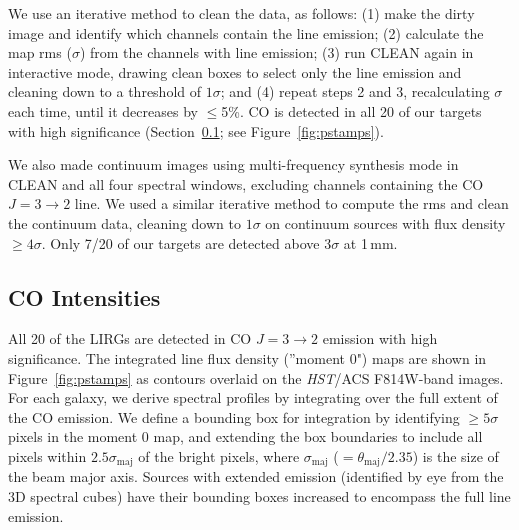 \documentclass[a4paper,fleqn,usenatbib]{mnras}
\begin{document}
We use an iterative method to clean the data, as follows: (1) make the dirty image and identify which channels contain the line emission; (2) calculate the map rms ($\sigma$) from the channels with line emission; (3) run CLEAN again in interactive mode, drawing clean boxes to select only the line emission and cleaning down to a threshold of $1\sigma$; and (4) repeat steps 2 and 3, recalculating $\sigma$ each time, until it decreases by $\le$5\%. CO is detected in all 20 of our targets with high significance (Section~\ref{ssec:covalues}; see Figure~\ref{fig:pstamps}).

We also made continuum images using multi-frequency synthesis mode in CLEAN and all four spectral windows, excluding channels containing the CO $J=3\rightarrow2$ line. We used a similar iterative method to compute the rms and clean the continuum data, cleaning down to $1\sigma$ on continuum sources with flux density $\ge4\sigma$.  Only 7/20 of our targets are detected above $3\sigma$ at 1\,mm. %

\subsection{CO Intensities}
\label{ssec:covalues}

All 20 of the LIRGs are detected in CO $J=3\rightarrow2$ emission with high significance. The integrated line flux density (''moment 0") maps are shown in Figure~\ref{fig:pstamps} as contours overlaid on the {\it HST}/ACS F814W-band images. %
For each galaxy, we derive spectral profiles by integrating over the full extent of the CO emission.  We define a bounding box for integration by identifying $\ge5\sigma$ pixels in the moment 0 map, and extending the box boundaries to include all pixels within $2.5\sigma_{\mathrm{maj}}$ of the bright pixels, where $\sigma_{\mathrm{maj}}$ ($=\theta_{\mathrm{maj}}/2.35$) is the size of the beam major axis.  Sources with extended emission (identified by eye from the 3D spectral cubes) have their bounding boxes increased to encompass the full line emission. 
\end{document}
